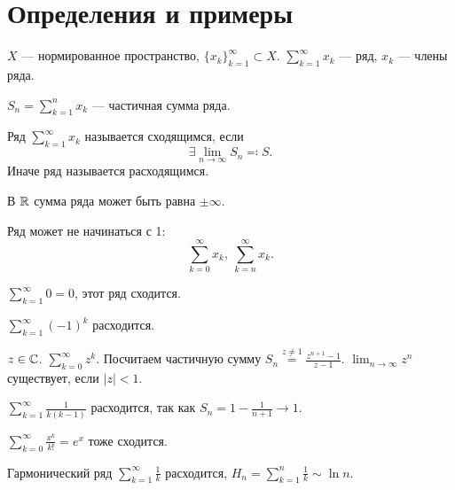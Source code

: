 \section{Определения и примеры}
\begin{defn}
    $ X$ --- нормированное пространство, $ \{x_k\}_{k=1}^{\infty} \subset X$. 
    $ \sum_{k=1}^{\infty}  x_k$ --- {\sf ряд}, $ x_k$ ---  {\sf  члены ряда}.    

    $ S_n = \sum_{k= 1}^{n} x_k$ --- {\sf частичная сумма ряда}.  
\end{defn}
\begin{defn}
    Ряд  $ \sum_{k=1}^{\infty} x_k$ называется {\sf сходящимся}, если 
    \[
    \exists \lim_{n \to \infty} S_n \eqqcolon S
    .\] 
    Иначе ряд называется {\sf расходящимся}.  
\end{defn}
\begin{rem}
    В $ \mathbb{R}$ сумма ряда может быть равна  $ \pm \infty$.
\end{rem}
\begin{rem}
    Ряд может не начинаться с 1:
    \[
	\sum_{k=0}^{\infty} x_k, ~ \sum_{k=n}^{\infty} x_k
    .\] 
\end{rem}
\begin{ex}
    $ \sum_{k=1}^{\infty} 0 = 0$, этот ряд сходится.
\end{ex}
\begin{ex}
    $
	\sum_{k=1}^{\infty} (-1)^{k}
	$  расходится.
\end{ex}
\begin{ex}
    $ z \in \mathbb{C}$. $ \sum_{k=0}^{\infty} z^{k}$. Посчитаем частичную сумму $ S_n \stackrel{z\ne 1}{=} \frac{z^{n+1} -1}{z-1}$. $ \lim_{n \to \infty} z^{n}$ существует, если $ \lvert z \rvert < 1$.
\end{ex}
\begin{ex}
    $ \sum_{k=1}^{\infty} \frac{1}{k(k-1)} $ расходится, так как $ S_n = 1 - \frac{1}{n+1} \to  1$.
\end{ex}
\begin{ex}
    $ \sum_{k=0}^{\infty} \frac{x^{k}}{k!} = e^{x}$ тоже сходится.
\end{ex}
\begin{ex}
    Гармонический ряд $ \sum_{k=1}^{\infty} \frac{1}{k}$ расходится, $ H_n = \sum_{k=1}^{n} \frac{1}{k} \sim \ln n$.
\end{ex}

